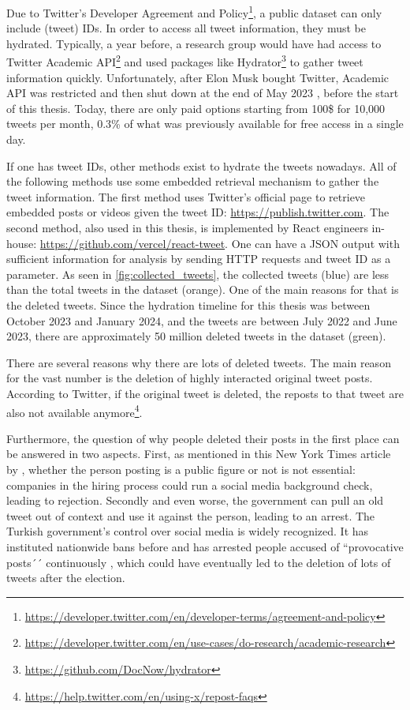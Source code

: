 Due to Twitter's Developer Agreement and Policy\footnote{\url{https://developer.twitter.com/en/developer-terms/agreement-and-policy}}, 
a public dataset can only include (tweet) IDs. In order to access all tweet information,
they must be hydrated. Typically, a year before, a research group would have had access 
to Twitter Academic API\footnote{\url{https://developer.twitter.com/en/use-cases/do-research/academic-research}} 
and used packages like Hydrator\footnote{\url{https://github.com/DocNow/hydrator}} to gather 
tweet information quickly. Unfortunately, after Elon Musk bought Twitter, Academic API was 
restricted and then shut down at the end of May 2023 \parencite{calma_twitter_academicAPI_elon_2023},
before the start of this thesis. Today, there are only paid 
options starting from 100\$ for 10,000 tweets per month, 0.3\% of what was previously 
available for free access in a single day. 

If one has tweet IDs, other methods exist to hydrate the tweets nowadays. 
All of the following methods use some embedded retrieval mechanism to gather 
the tweet information. The first method uses Twitter's official page to 
retrieve embedded posts or videos given the tweet ID\@: \url{https://publish.twitter.com}. 
The second method, also used in this thesis, is implemented by React engineers in-house\@:
\url{https://github.com/vercel/react-tweet}. One can have a JSON output with sufficient 
information for analysis by sending HTTP requests and tweet ID as a parameter. 
As seen in \autoref{fig:collected_tweets}, the collected tweets (blue) are less than 
the total tweets in the dataset (orange). One of the main reasons for that is the deleted 
tweets. Since the hydration timeline for this thesis was between October 2023 and January 2024, 
and the tweets are between July 2022 and June 2023, there are approximately 50 million 
deleted tweets in the dataset (green). 

There are several reasons why there are lots of deleted tweets. The main reason for the 
vast number is the deletion of highly interacted original tweet posts. According to Twitter, 
if the original tweet is deleted, the reposts to that tweet are also not available 
anymore\footnote{\url{https://help.twitter.com/en/using-x/repost-faqs}}. 

Furthermore, the question of why people deleted their posts in the first place 
can be answered in two aspects. First, as mentioned in this New York Times article 
by \textcite{klosowski_delete_tweets_2022}, whether the person posting is a public figure 
or not is not essential\@: companies in the hiring process could run a social media 
background check, leading to rejection. Secondly and even worse, the government can pull 
an old tweet out of context and use it against the person, leading to an arrest. 
The Turkish government's control over social media is widely recognized. 
It has instituted nationwide bans before and has arrested people accused of 
``provocative posts´´ continuously \parencite{scott_turkey_social_media_ban_2023}, 
which could have eventually led to the deletion of lots of tweets after the election.

